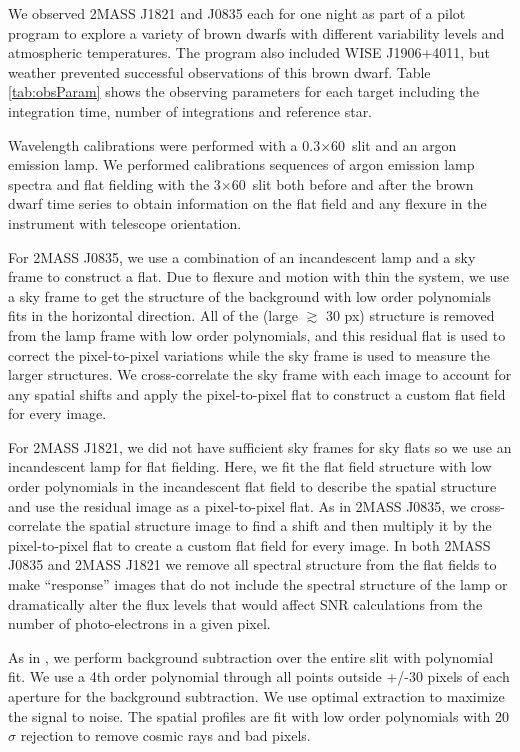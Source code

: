 \documentclass[twocolumn]{aastex6}
\begin{document}
We observed 2MASS J1821 and J0835 each for one night as part of a pilot program to explore a variety of brown dwarfs with different variability levels and atmospheric temperatures.
The program also included WISE J1906+4011, but weather prevented successful observations of this brown dwarf.
Table \ref{tab:obsParam} shows the observing parameters for each target including the integration time, number of integrations and reference star.

Wavelength calibrations were performed with a 0.3$\times$60\arcsec\ slit and an argon emission lamp.
We performed calibrations sequences of argon emission lamp spectra and flat fielding with the 3$\times$60\arcsec\ slit both before and after the brown dwarf time series to obtain information on the flat field and any flexure in the instrument with telescope orientation.

For 2MASS J0835, we use a combination of an incandescent lamp and a sky frame to construct a flat.
Due to flexure and motion with thin the system, we use a sky frame to get the structure of the background with low order polynomials fits in the horizontal direction.
All of the (large $\gtrsim$ 30 px) structure is removed from the lamp frame with low order polynomials, and this residual flat is used to correct the pixel-to-pixel variations while the sky frame is used to measure the larger structures.
We cross-correlate the sky frame with each image to account for any spatial shifts and apply the pixel-to-pixel flat to construct a custom flat field for every image.

For 2MASS J1821, we did not have sufficient sky frames for sky flats so we use an incandescent lamp for flat fielding.
Here, we fit the flat field structure with low order polynomials in the incandescent flat field to describe the spatial structure and use the residual image as a pixel-to-pixel flat.
As in 2MASS J0835, we cross-correlate the spatial structure image to find a shift and then multiply it by the pixel-to-pixel flat to create a custom flat field for every image.
In both 2MASS J0835 and 2MASS J1821 we remove all spectral structure from the flat fields to make ``response'' images that do not include the spectral structure of the lamp or dramatically alter the flux levels that would affect SNR calculations from the number of photo-electrons in a given pixel.

As in \citep{schlawin2016kic1255}, we perform background subtraction over the entire slit with polynomial fit.
We use a 4th order polynomial through all points outside +/-30 pixels of each aperture for the background subtraction.
We use optimal extraction \citep{horne1986optimalE} to maximize the signal to noise.
The spatial profiles are fit with low order polynomials with 20$\sigma$ rejection to remove cosmic rays and bad pixels.
\end{document}

